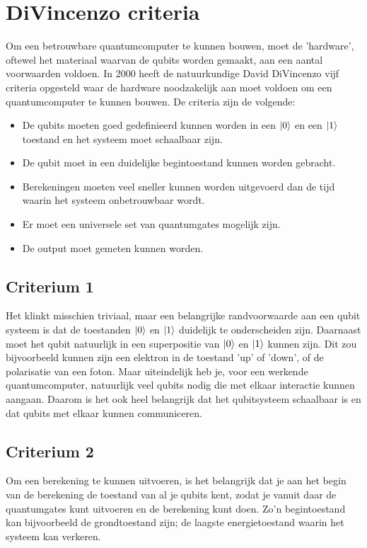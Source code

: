 \documentclass[../../main.tex]{subfiles}
\begin{document}
\section{DiVincenzo criteria}
Om een betrouwbare quantumcomputer te kunnen bouwen, moet de 'hardware', oftewel het materiaal waarvan de qubits worden gemaakt, aan een aantal voorwaarden voldoen. In 2000 heeft de natuurkundige David DiVincenzo vijf criteria opgesteld waar de hardware noodzakelijk aan moet voldoen om een quantumcomputer te kunnen bouwen. De criteria zijn de volgende:
\begin{itemize} 
\item De qubits moeten goed gedefinieerd kunnen worden in een $\ket{0}$ en een $\ket{1}$ toestand en het systeem moet schaalbaar zijn. 
\item De qubit moet in een duidelijke begintoestand kunnen worden gebracht. 
\item Berekeningen moeten veel sneller kunnen worden uitgevoerd dan de tijd waarin het systeem onbetrouwbaar wordt. 
\item Er moet een universele set van quantumgates mogelijk zijn. 
\item De output moet gemeten kunnen worden. 
\end{itemize}
\subsection{Criterium 1}
Het klinkt misschien triviaal, maar een belangrijke randvoorwaarde aan een qubit systeem is dat de toestanden $\ket{0}$ en $\ket{1}$ duidelijk te onderscheiden zijn. Daarnaast moet het qubit natuurlijk in een superpositie van $\ket{0}$ en $\ket{1}$ kunnen zijn. Dit zou bijvoorbeeld kunnen zijn een elektron in de toestand 'up' of 'down', of de polarisatie van een foton. Maar uiteindelijk heb je, voor een werkende quantumcomputer, natuurlijk veel qubits nodig die met elkaar interactie kunnen aangaan. Daarom is het ook heel belangrijk dat het qubitsysteem schaalbaar is en dat qubits met elkaar kunnen communiceren.

\subsection{Criterium 2}
Om een berekening te kunnen uitvoeren, is het belangrijk dat je aan het begin van de berekening de toestand van al je qubits kent, zodat je vanuit daar de quantumgates kunt uitvoeren en de berekening kunt doen. Zo'n begintoestand kan bijvoorbeeld de grondtoestand zijn; de laagste energietoestand waarin het systeem kan verkeren. 
\end{document}

